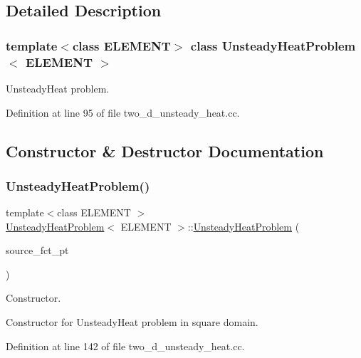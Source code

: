 \subsection{Detailed Description}
\subsubsection*{template$<$class E\+L\+E\+M\+E\+NT$>$\newline
class Unsteady\+Heat\+Problem$<$ E\+L\+E\+M\+E\+N\+T $>$}

Unsteady\+Heat problem. 

Definition at line 95 of file two\+\_\+d\+\_\+unsteady\+\_\+heat.\+cc.



\subsection{Constructor \& Destructor Documentation}
\mbox{\label{classUnsteadyHeatProblem_abd3a46eea132b1e5872be6a6309a51b2}} 
\subsubsection{\texorpdfstring{Unsteady\+Heat\+Problem()}{UnsteadyHeatProblem()}\hspace{0.1cm}{\footnotesize\ttfamily [1/2]}}
{\footnotesize\ttfamily template$<$class E\+L\+E\+M\+E\+NT $>$ \\
\hyperlink{classUnsteadyHeatProblem}{Unsteady\+Heat\+Problem}$<$ E\+L\+E\+M\+E\+NT $>$\+::\hyperlink{classUnsteadyHeatProblem}{Unsteady\+Heat\+Problem} (\begin{DoxyParamCaption}\item[{Unsteady\+Heat\+Equations$<$ 2 $>$\+::Unsteady\+Heat\+Source\+Fct\+Pt}]{source\+\_\+fct\+\_\+pt }\end{DoxyParamCaption})}



Constructor. 

Constructor for Unsteady\+Heat problem in square domain. 

Definition at line 142 of file two\+\_\+d\+\_\+unsteady\+\_\+heat.\+cc.



